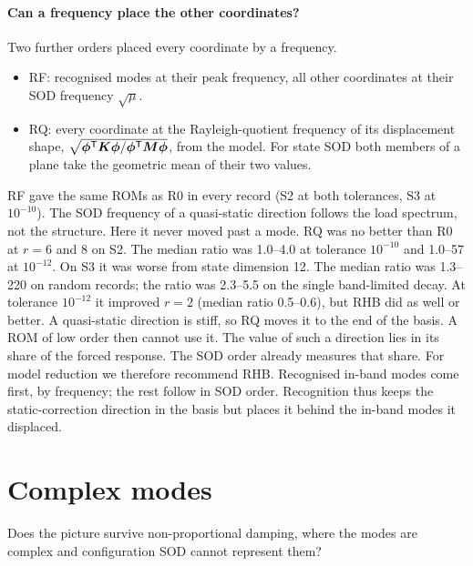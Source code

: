 \documentclass[preprint,12pt]{elsarticle}
\begin{document}
\paragraph{Can a frequency place the other coordinates?} Two further orders placed every coordinate by a frequency.
\begin{itemize}
\item RF: recognised modes at their peak frequency, all other coordinates at their SOD frequency $\sqrt{\mu}$.
\item RQ: every coordinate at the Rayleigh-quotient frequency of its displacement shape, $\sqrt{\bm{\phi}^{\mathsf T}\bm{K}\bm{\phi}/\bm{\phi}^{\mathsf T}\bm{M}\bm{\phi}}$, from the model. For state SOD both members of a plane take the geometric mean of their two values.
\end{itemize}
RF gave the same ROMs as R0 in every record (S2 at both tolerances, S3 at $10^{-10}$). The SOD frequency of a quasi-static direction follows the load spectrum, not the structure. Here it never moved past a mode.
RQ was no better than R0 at $r=6$ and 8 on S2. The median ratio was 1.0--4.0 at tolerance $10^{-10}$ and 1.0--57 at $10^{-12}$. On S3 it was worse from state dimension 12. The median ratio was 1.3--220 on random records; the ratio was 2.3--5.5 on the single band-limited decay.
At tolerance $10^{-12}$ it improved $r=2$ (median ratio 0.5--0.6), but RHB did as well or better. A quasi-static direction is stiff, so RQ moves it to the end of the basis. A ROM of low order then cannot use it.
The value of such a direction lies in its share of the forced response. The SOD order already measures that share.
For model reduction we therefore recommend RHB. Recognised in-band modes come first, by frequency; the rest follow in SOD order.
Recognition thus keeps the static-correction direction in the basis but places it behind the in-band modes it displaced.


\section{Complex modes}\label{sec:complex}
Does the picture survive non-proportional damping, where the modes are complex and configuration SOD cannot represent them?
\end{document}
